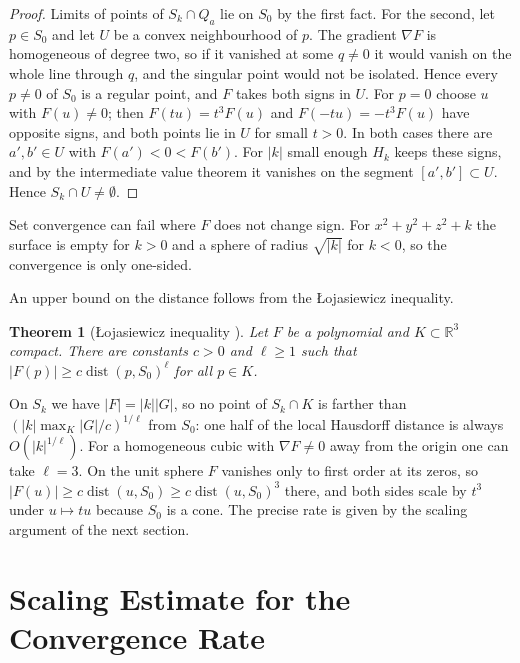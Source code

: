 \documentclass[12pt, a4paper, oneside]{book}
\theoremstyle{plain}
\newtheorem{theorem}{Theorem}[chapter]
\theoremstyle{definition}
\theoremstyle{remark}
\theoremstyle{definition}
\begin{document}
\begin{proof}
Limits of points of $S_k\cap Q_a$ lie on $S_0$ by the first fact. For the second, let $p\in S_0$ and let $U$ be a convex neighbourhood of $p$. The gradient $\nabla F$ is homogeneous of degree two, so if it vanished at some $q\neq0$ it would vanish on the whole line through $q$, and the singular point would not be isolated. Hence every $p\neq0$ of $S_0$ is a regular point, and $F$ takes both signs in $U$. For $p=0$ choose $u$ with $F(u)\neq0$; then $F(tu)=t^3F(u)$ and $F(-tu)=-t^3F(u)$ have opposite signs, and both points lie in $U$ for small $t>0$. In both cases there are $a',b'\in U$ with $F(a')<0<F(b')$. For $|k|$ small enough $H_k$ keeps these signs, and by the intermediate value theorem it vanishes on the segment $[a',b']\subset U$. Hence $S_k\cap U\neq\emptyset$.
\end{proof}

Set convergence can fail where $F$ does not change sign. For $x^2+y^2+z^2+k$ the surface is empty for $k>0$ and a sphere of radius $\sqrt{|k|}$ for $k<0$, so the convergence is only one-sided.

An upper bound on the distance follows from the Łojasiewicz inequality.

\begin{theorem}[Łojasiewicz inequality \cite{lojasiewicz1959division,bochnak1998real}]
\label{thm:lojasiewicz}
Let $F$ be a polynomial and $K\subset\mathbb{R}^3$ compact. There are constants $c>0$ and $\ell\ge1$ such that $|F(p)|\ge c\operatorname{dist}(p,S_0)^\ell$ for all $p\in K$.
\end{theorem}

On $S_k$ we have $|F|=|k||G|$, so no point of $S_k\cap K$ is farther than $(|k|\max_K|G|/c)^{1/\ell}$ from $S_0$: one half of the local Hausdorff distance is always $O(|k|^{1/\ell})$. For a homogeneous cubic with $\nabla F\neq0$ away from the origin one can take $\ell=3$. On the unit sphere $F$ vanishes only to first order at its zeros, so $|F(u)|\ge c\operatorname{dist}(u,S_0)\ge c\operatorname{dist}(u,S_0)^3$ there, and both sides scale by $t^3$ under $u\mapsto tu$ because $S_0$ is a cone. The precise rate is given by the scaling argument of the next section.

\section{Scaling Estimate for the Convergence Rate}
\label{sec:scaling}
\label{sec:r-scaling}
\end{document}
